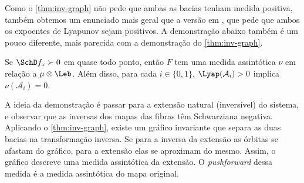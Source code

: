 \documentclass[../fapesp0]{subfiles}
\begin{document}
Como o \cref{thm:inv-graph} não pede que ambas as bacias tenham medida positiva, também obtemos um enunciado mais geral que a versão em \cite[teorema 5.1]{bonifantSchwarzianDerivativesCylinder2008}, que pede que ambos os expoentes de Lyapunov sejam positivos. A demonstração abaixo também é um pouco diferente, mais parecida com a demonstração do \cref{thm:inv-graph}.

\begin{theorem}
  Se \(\SchD f_x \succ 0\) em quase todo ponto, %
  então \(F\) tem uma medida assintótica \(\nu\) em relação a \(\mu \otimes \Leb\). Além disso, para cada \(i \in \{ 0,1 \}\), \(\Lyap(\mathcal{A}_i) > 0\) implica \(\nu(\mathcal{A}_i) = 0\).
\end{theorem}
A ideia da demonstração é passar para a extensão natural (inversível) do sistema, e observar que as inversas dos mapas das fibras têm Schwarziana negativa. Aplicando o \cref{thm:inv-graph}, existe um gráfico invariante que separa as duas bacias na transformação inversa. Se para a inversa da extensão as órbitas se afastam do gráfico, para a extensão elas se aproximam do mesmo. Assim, o gráfico descreve uma medida assintótica da extensão. O \textit{pushforward} dessa medida é a medida assintótica do mapa original. 
\end{document}
